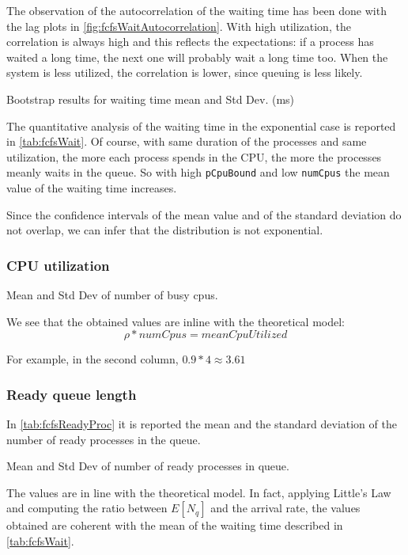The observation of the autocorrelation of the waiting time has been done with the 
lag plots in \cref{fig:fcfsWaitAutocorrelation}. With high utilization,
the correlation is always high and this reflects the expectations: if a process has
waited a long time, the next one will probably wait a long time too. When the system
is less utilized, the correlation is lower, since queuing is less likely.

\begin{table}[H]
    \centering
    \scriptsize
    
    \caption{Bootstrap results for waiting time mean and Std Dev. (ms)}
    \label{tab:fcfsWait}
\end{table}

The quantitative analysis of the waiting time in the exponential case is reported in 
\cref{tab:fcfsWait}. Of course, with same duration of the processes and same
utilization, the more each process spends in the CPU, the more the processes
meanly waits in the queue. So with high \texttt{pCpuBound} and low \texttt{numCpus}
the mean value of the waiting time increases.

Since the confidence intervals of the mean value and of the standard deviation do 
not overlap, we can infer that the distribution is not exponential.

\subsubsection{CPU utilization}

\label{sec:fcfsCpuUtilization}

\begin{table}[H]
    \centering
    \scriptsize
    
    \caption{Mean and Std Dev of number of busy cpus.}
    \label{tab:fcfsCpus}
\end{table}

We see that the obtained values are inline with the theoretical model:
\begin{equation}
    \rho * numCpus = meanCpuUtilized
\end{equation}


For example, in the second column, $0.9 * 4 \approx 3.61$ 

\subsubsection{Ready queue length}

In \cref{tab:fcfsReadyProc} it is reported the mean and the standard deviation 
of the number of ready processes in the queue. 

\begin{table}[H]
    \centering
    \scriptsize
    
    \caption{Mean and Std Dev of number of ready processes in queue.}
    \label{tab:fcfsReadyProc}
\end{table}

The values are in line with the theoretical model. In fact, applying Little's Law and computing the ratio between
$E[N_q]$ and the arrival rate, the values obtained are coherent with the mean of
the waiting time described in \cref{tab:fcfsWait}.